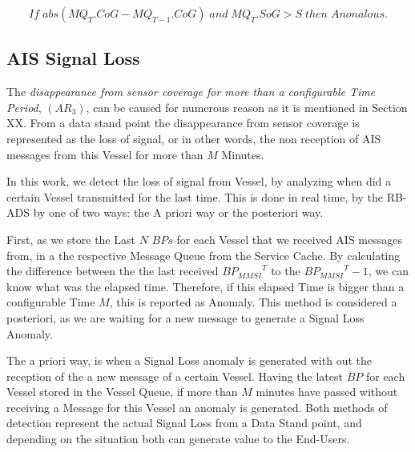 \[ If\; abs(MQ_{T}.CoG - MQ_{T-1}.CoG)\;and\; MQ_T.SoG > S\; then\; Anonalous.\]

\subsection{AIS Signal Loss}
\label{subsection: 4 AIS Signal Loss}
The \textit{disappearance from sensor coverage for more than a configurable Time Period}, $(AR_3)$, can be caused for numerous reason as it is mentioned in Section XX. From a data stand point the disappearance from sensor coverage is represented as the loss of signal, or in other words, the non reception of AIS messages from this Vessel for more than $M$ Minutes.

In this work, we detect the loss of signal from Vessel, by analyzing when did a certain Vessel transmitted for the last time. This is done in real time, by the RB-ADS by one of two ways: the A priori way or the posteriori way.

First, as we store the Last $N$ $BPs$ for each Vessel that we received AIS messages from, in a the respective Message Queue from the Service Cache. By calculating the difference between the the last received ${BP_{MMSI}}^T$ to the ${BP_{MMSI}}^T-1$, we can know what was the elapsed time. Therefore, if this elapsed Time is bigger than a configurable Time $M$, this is reported as Anomaly. This method is considered a posteriori, as we are waiting for a new message to generate a Signal Loss Anomaly.

The a priori way, is when a Signal Loss anomaly is generated with out the reception of the a new message of a certain Vessel. Having the latest $BP$ for each Vessel stored in the Vessel Queue, if more than $M$ minutes have passed without receiving a Message for this Vessel an anomaly is generated. Both methods of detection represent the actual Signal Loss from a Data Stand point, and depending on the situation both can generate value to the End-Users. 

